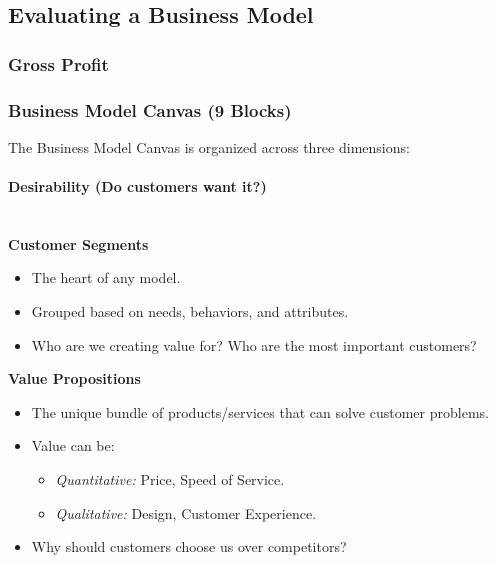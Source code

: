 \subsection{Evaluating a Business Model}

\subsubsection{Gross Profit}

\subsubsection{Business Model Canvas (9 Blocks)}

The Business Model Canvas is organized across three dimensions:

\paragraph{Desirability (Do customers want it?)}\mbox{}\\[4pt]

\textbf{Customer Segments}
\begin{itemize}
    \item The heart of any model.
    \item Grouped based on needs, behaviors, and attributes.
    \item Who are we creating value for? Who are the most important customers?
\end{itemize}

\medskip

\textbf{Value Propositions}
\begin{itemize}
    \item The unique bundle of products/services that can solve customer problems.
    \item Value can be:
    \begin{itemize}
        \item \textit{Quantitative:} Price, Speed of Service.
        \item \textit{Qualitative:} Design, Customer Experience.
    \end{itemize}
    \item Why should customers choose us over competitors?
\end{itemize}

